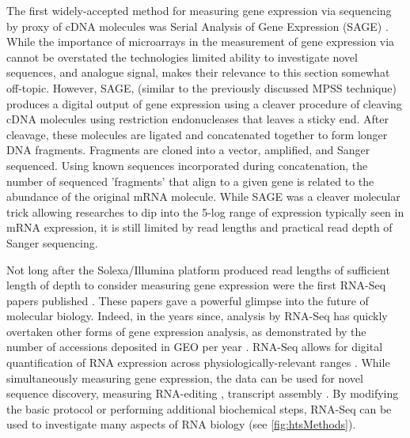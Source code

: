 The first widely-accepted method for measuring gene expression via sequencing by proxy of cDNA molecules was Serial Analysis of Gene Expression (SAGE) \citep{Velculescu1995a}. While the importance of microarrays in the measurement of gene expression via cannot be overstated \citep{Shendure2008,Marioni2008} the technologies limited ability to investigate novel sequences, and analogue signal, makes their relevance to this section somewhat off-topic. However, SAGE, (similar to the previously discussed MPSS technique) produces a digital output of gene expression using a cleaver procedure of cleaving cDNA molecules using restriction endonucleases that leaves a sticky end. After cleavage, these molecules are ligated and concatenated together to form longer DNA fragments. Fragments are cloned into a vector, amplified, and Sanger sequenced. Using known sequences incorporated during concatenation, the number of sequenced 'fragments' that align to a given gene is related to the abundance of the original mRNA molecule. While SAGE was a cleaver molecular trick allowing researches to dip into the 5-log range of expression typically seen in mRNA expression, it is still limited by read lengths and practical read depth of Sanger sequencing. 

Not long after the Solexa/Illumina platform produced read lengths of sufficient length of depth to consider measuring gene expression were the first RNA-Seq papers published \citep{Mortazavi2008, Nagalakshmi2008,Lister2008}. These papers gave a powerful glimpse into the future of molecular biology. Indeed, in the years since, analysis by RNA-Seq has quickly overtaken other forms of gene expression analysis, as demonstrated by the number of accessions deposited in GEO per year \citep{Barrett2013}. RNA-Seq allows for digital quantification of RNA expression across physiologically-relevant ranges \citep{Blencowe2009}. While simultaneously measuring gene expression, the data can be used for novel sequence discovery, measuring RNA-editing \citep{Li2011}, transcript assembly \citep{Trapnell2010}. By modifying the basic protocol or performing additional biochemical steps, RNA-Seq can be used to investigate many aspects of RNA biology (see \ref{fig:htsMethods}). 

